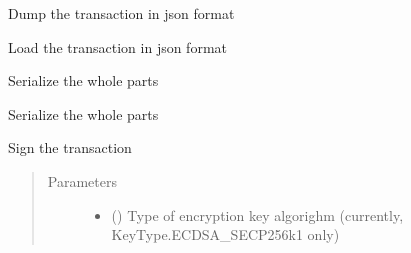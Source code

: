 \documentclass[letterpaper,10pt,english]{sphinxmanual}
\begin{document}
\begin{fulllineitems}
\begin{fulllineitems}
\label{\detokenize{bbc1.core.bbclib:bbc1.core.bbclib.BBcTransaction.jsondump}}
Dump the transaction in json format

\end{fulllineitems}


\begin{fulllineitems}
\label{\detokenize{bbc1.core.bbclib:bbc1.core.bbclib.BBcTransaction.jsonload}}
Load the transaction in json format

\end{fulllineitems}


\begin{fulllineitems}
\label{\detokenize{bbc1.core.bbclib:bbc1.core.bbclib.BBcTransaction.serialize}}
Serialize the whole parts

\end{fulllineitems}


\begin{fulllineitems}
\label{\detokenize{bbc1.core.bbclib:bbc1.core.bbclib.BBcTransaction.serialize_bson}}
Serialize the whole parts

\end{fulllineitems}


\begin{fulllineitems}
\label{\detokenize{bbc1.core.bbclib:bbc1.core.bbclib.BBcTransaction.sign}}
Sign the transaction
\begin{quote}\begin{description}
\item[{Parameters}] \leavevmode\begin{itemize}
\item {} 
 () \textendash{} Type of encryption key algorighm (currently, KeyType.ECDSA\_SECP256k1 only)


\end{itemize}
\end{description}
\end{quote}
\end{fulllineitems}
\end{fulllineitems}
\end{document}
